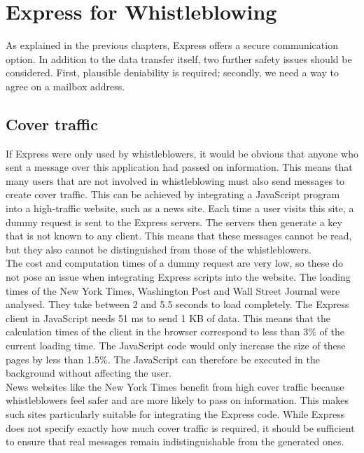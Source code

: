\documentclass[a4paper]{article}
\begin{document}
\section{Express for Whistleblowing}
\label{sec:whistleblowing}
As explained in the previous chapters, Express offers a secure communication option.  In addition to the data transfer itself, two further safety issues should be considered. First, plausible deniability is required; secondly, we need a way to agree on a mailbox address. 

\subsection{Cover traffic}
If Express were only used by whistleblowers, it would be obvious that anyone who sent a message over this application had passed on information. This means that many users that are not involved in whistleblowing must also send messages to create cover traffic. This can be achieved by integrating a JavaScript program into a high-traffic website, such as a news site. Each time a user visits this site, a dummy request is sent to the Express servers. The servers then generate a key that is not known to any client. This means that these messages cannot be read, but they also cannot be distinguished from those of the whistleblowers. \\
The cost and computation times of a dummy request are very low, so these do not pose an issue when integrating Express scripts into the website. The loading times of the New York Times, Washington Post and Wall Street Journal were analysed. They take between 2 and 5.5 seconds to load completely. The Express client in JavaScript needs 51 ms to send 1 KB of data. This means that the calculation times of the client in the browser correspond to less than 3\% of the current loading time. The JavaScript code would only increase the size of these pages by less than 1.5\%. The JavaScript can therefore be executed in the background without affecting the user. \\
News websites like the New York Times benefit from high cover traffic because whistleblowers feel safer and are more likely to pass on information. This makes such sites particularly suitable for integrating the Express code. While Express does not specify exactly how much cover traffic is required, it should be sufficient to ensure that real messages remain indistinguishable from the generated ones.
\end{document}
